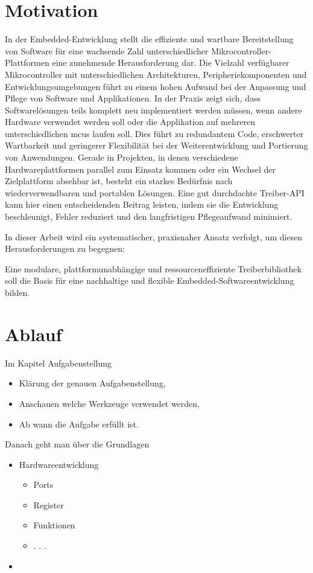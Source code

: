 \section{Motivation}
In der Embedded-Entwicklung stellt die effiziente und wartbare Bereitstellung von Software für eine wachsende Zahl unterschiedlicher Mikrocontroller-Plattformen eine zunehmende Herausforderung dar.
Die Vielzahl verfügbarer Mikrocontroller mit unterschiedlichen Architekturen, Peripheriekomponenten und Entwicklungsumgebungen führt zu einem hohen Aufwand bei der Anpassung und Pflege von Software und Applikationen.
In der Praxis zeigt sich, dass Softwarelösungen teils komplett neu implementiert werden müssen, wenn andere Hardware verwendet werden soll oder die Applikation auf mehreren unterschiedlichen \gls{mcus} laufen soll.
Dies führt zu redundantem Code, erschwerter Wartbarkeit und geringerer Flexibilität bei der Weiterentwicklung und Portierung von Anwendungen.
Gerade in Projekten, in denen verschiedene Hardwareplattformen parallel zum Einsatz kommen oder ein Wechsel der Zielplattform absehbar ist, besteht ein starkes Bedürfnis nach wiederverwendbaren und portablen Lösungen. Eine gut durchdachte Treiber-API kann hier einen entscheidenden Beitrag leisten, indem sie die Entwicklung beschleunigt, Fehler reduziert und den langfristigen Pflegeaufwand minimiert. 
 
In dieser Arbeit wird ein systematischer, praxisnaher Ansatz verfolgt, um diesen Herausforderungen zu begegnen:

Eine modulare, plattformunabhängige und ressourceneffiziente Treiberbibliothek soll die Basis für eine nachhaltige und flexible Embedded-Softwareentwicklung bilden. 


\section{Ablauf}
Im Kapitel Aufgabenstellung
	\begin{itemize}
		\item Klärung der genauen Aufgabenstellung,
		\item Anschauen welche Werkzeuge verwendet werden,
		\item Ab wann die Aufgabe erfüllt ist.
	\end{itemize}
	
Danach geht man über die Grundlagen
	\begin{itemize}
		\item Hardwareentwicklung
		\begin{itemize}
			\item Ports
			\item Register
			\item Funktionen
			\item . . .
		\end{itemize}
		\item 
	\end{itemize}

